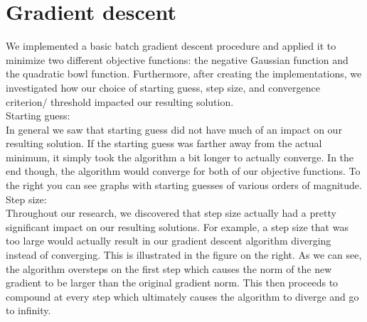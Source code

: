 \documentclass{article}
\begin{document}

\section{Gradient descent}

We implemented a basic batch gradient descent procedure and applied it to minimize two different objective functions: the negative Gaussian function and the quadratic bowl function. Furthermore, after creating the implementations, we investigated how our choice of starting guess, step size, and convergence criterion/ threshold impacted our resulting solution. \\

Starting guess: \\

In general we saw that starting guess did not have much of an impact on our resulting solution. If the starting guess was farther away from the actual minimum, it simply took the algorithm a bit longer to actually converge. In the end though, the algorithm would converge for both of our objective functions. To the right you can see graphs with starting guesses of various orders of magnitude. \\

Step size: \\

Throughout our research, we discovered that step size actually had a pretty significant impact on our resulting solutions. For example, a step size that was too large would actually result in our gradient descent algorithm diverging instead of converging. This is illustrated in the figure on the right. As we can see, the algorithm oversteps on the first step which causes the norm of the new gradient to be larger than the original gradient norm. This then proceeds to compound at every step which ultimately causes the algorithm to diverge and go to infinity. \\
\end{document}
